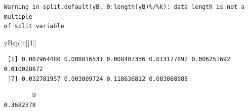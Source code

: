 \documentclass[
  12pt]{article}
\newenvironment{Shaded}{\begin{snugshade}}{\end{snugshade}}
\newcommand{\AttributeTok}[1]{\textcolor[rgb]{0.13,0.29,0.53}{#1}}
\newcommand{\ControlFlowTok}[1]{\textcolor[rgb]{0.13,0.29,0.53}{\textbf{#1}}}
\newcommand{\DecValTok}[1]{\textcolor[rgb]{0.00,0.00,0.81}{#1}}
\newcommand{\FunctionTok}[1]{\textcolor[rgb]{0.13,0.29,0.53}{\textbf{#1}}}
\newcommand{\NormalTok}[1]{#1}
\newcommand{\OtherTok}[1]{\textcolor[rgb]{0.56,0.35,0.01}{#1}}
\newcommand{\SpecialCharTok}[1]{\textcolor[rgb]{0.81,0.36,0.00}{\textbf{#1}}}
\newcommand{\StringTok}[1]{\textcolor[rgb]{0.31,0.60,0.02}{#1}}
\begin{document}
\begin{verbatim}
Warning in split.default(yB, 0:length(yB)%/%k): data length is not a multiple
of split variable
\end{verbatim}

\begin{Shaded}
\begin{Highlighting}[]
\NormalTok{yBsplit[[}\DecValTok{1}\NormalTok{]]}
\end{Highlighting}
\end{Shaded}

\begin{verbatim}
 [1] 0.007964480 0.008016531 0.008407336 0.013177892 0.006251692 0.010028872
 [7] 0.032781957 0.003009724 0.118636812 0.083068988
\end{verbatim}

\begin{Shaded}
\end{Shaded}

\begin{verbatim}
        D 
0.3682378 
\end{verbatim}

\begin{Shaded}
\end{Shaded}
\end{document}
